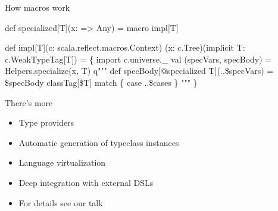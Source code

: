 \documentclass[svgnames,dvipsnames,hyperref={bookmarks=false},usepdftitle=false]{beamer}
\begin{document}
\begin{frame}[fragile]{How macros work}

\begin{semiverbatim}
def specialized[T](x: => Any) = macro impl[T]

def impl[T](\alert<1>{c: scala.reflect.macros.Context})
    \alert<2>{(x: c.Tree)(implicit T: c.WeakTypeTag[T])} = \{
  \alert<1>{import c.universe._}
  \alert<2>{val (specVars, specBody) = Helpers.specialize(x, T)}
  \alert<3>{q"""}
    \alert<3>{def specBody[@specialized T](..\$specVars) = \$specBody}
    \alert<3>{classTag[\$T] match \{ case ..\$cases \}}
  \alert<3>{"""}
\}
\end{semiverbatim}

\begin{itemize}
\end{itemize}

\end{frame}

\begin{frame}{There's more}

\begin{itemize}
\item Type providers
\item Automatic generation of typeclass instances
\item Language virtualization
\item Deep integration with external DSLs
\item For details see our  talk
\end{itemize}

\end{frame}

\end{document}
